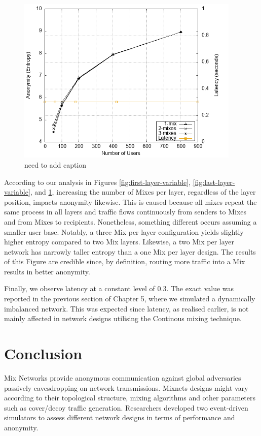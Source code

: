 \documentclass[logo,msc,cyber]{infthesis}   %
\begin{document}
\begin{figure}[h!]
    \centering
    \includegraphics[height=8cm]{figures/simulator_extentions/middle_layer_variable.png}
    \caption{need to add caption}
    \label{fig:middle-layer-variable}
\end{figure} 

According to our analysis in Figures \ref{fig:first-layer-variable},
\ref{fig:last-layer-variable}, and \ref{fig:middle-layer-variable},  increasing
the number of Mixes per layer, regardless of the layer position, impacts anonymity
likewise. This is caused because all mixes repeat the same process in all layers
and traffic flows continuously from senders to Mixes and from Mixes to
recipients. Nonetheless, something different occurs assuming a smaller user
base. Notably, a three Mix per layer configuration yields slightly higher entropy
compared to two Mix layers. Likewise, a two Mix per layer network has narrowly
taller entropy than a one Mix per layer design. The results of this Figure are
credible since, by definition, routing more traffic into a Mix results in better
anonymity.

Finally, we observe latency at a constant level of 0.3. The exact value was
reported in the previous section of Chapter 5, where we simulated a dynamically
imbalanced network. This was expected since latency, as realised earlier, is not
mainly affected in network designs utilising the Continous mixing technique. 

\chapter{Conclusion}

Mix Networks provide anonymous communication against global adversaries
passively eavesdropping on network transmissions. Mixnets designs might vary
according to their topological structure, mixing algorithms and other parameters
such as cover/decoy traffic generation. Researchers developed two event-driven
simulators to assess different network designs in terms of performance and
anonymity.
\end{document}
